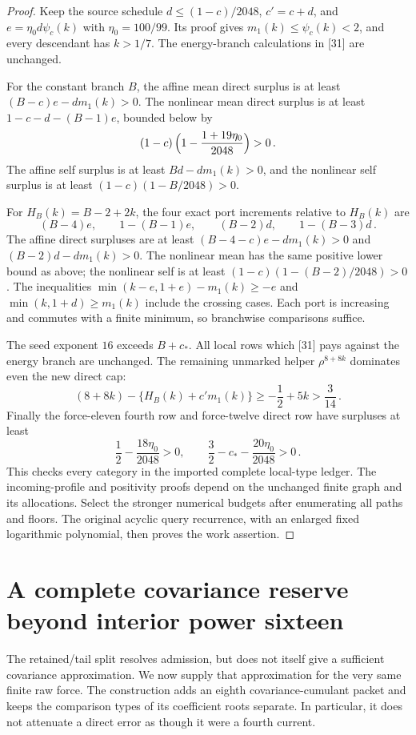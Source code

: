 \documentclass[11pt]{article}
\numberwithin{equation}{section}
\theoremstyle{remark}\newtheorem{remark}[theorem]{Remark}
\begin{document}
\begin{proof}
Keep the source schedule $d\le(1-c)/2048$, $c'=c+d$, and
$e=\eta_0d\psi_c(k)$ with $\eta_0=100/99$. Its proof gives
$m_1(k)\le\psi_c(k)<2$, and every descendant has $k>1/7$.
The energy-branch calculations in [31] are unchanged.

For the constant branch $B$, the affine mean direct surplus is at
least $(B-c)e-dm_1(k)>0$. The nonlinear mean direct surplus is
at least $1-c-d-(B-1)e$, bounded below by
\[
 (1-c)\,\Bigl(1-\frac{1+19\eta_0}{2048}\Bigr)>0\,.
\]
The affine self surplus is at least $Bd-dm_1(k)>0$, and the
nonlinear self surplus is at least $(1-c)(1-B/2048)>0$.

For $H_B(k)=B-2+2k$, the four exact port increments relative to
$H_B(k)$ are
\[
 (B-4)e,\qquad 1-(B-1)e,\qquad (B-2)d,
 \qquad 1-(B-3)d\,.
\]
The affine direct surpluses are at least
$(B-4-c)e-dm_1(k)>0$ and $(B-2)d-dm_1(k)>0$.
The nonlinear mean has the same positive lower bound as above;
the nonlinear self is at least $(1-c)(1-(B-2)/2048)>0$.
The inequalities
$\min(k-e,1+e)-m_1(k)\ge-e$ and
$\min(k,1+d)\ge m_1(k)$ include the crossing cases.
Each port is increasing and commutes with a finite minimum, so
branchwise comparisons suffice.

The seed exponent $16$ exceeds $B+c_*$. All local rows which
[31] pays against the energy branch are unchanged. The remaining
unmarked helper $\rho^{8+8k}$ dominates even the new direct cap:
\[
 (8+8k)-\{H_B(k)+c'm_1(k)\}
 \ge-\frac12+5k>\frac3{14}\,.
\]
Finally the force-eleven fourth row and force-twelve direct row have
surpluses at least
\[
 \frac12-\frac{18\eta_0}{2048}>0,\qquad
 \frac32-c_*-\frac{20\eta_0}{2048}>0\,.
\]
This checks every category in the imported complete local-type ledger.
The incoming-profile and positivity proofs depend on the unchanged
finite graph and its allocations. Select the stronger numerical
budgets after enumerating all paths and floors. The original acyclic
query recurrence, with an enlarged fixed logarithmic polynomial,
then proves the work assertion.
\end{proof}

\section{A complete covariance reserve beyond interior power sixteen}
\label{sec:covariance-sixteen}\label{sec:covledger}
The retained/tail split resolves admission, but does not itself give a
sufficient covariance approximation. We now supply that approximation
for the very same finite raw force. The construction adds an eighth
covariance-cumulant packet and keeps the comparison types of its
coefficient roots separate. In particular, it does not attenuate a
direct error as though it were a fourth current.
\end{document}
